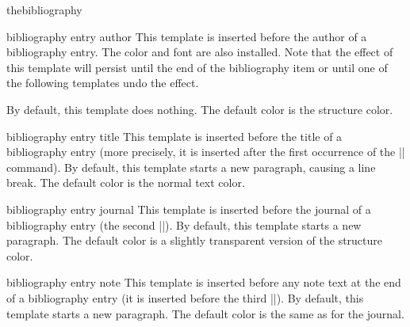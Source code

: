 \begin{environment}{{thebibliography}}
  \begin{element}{bibliography entry author}\yes\yes\yes
    This template is inserted before the author of a bibliography entry. The color and font are also installed. Note that the effect of this template will persist until the end of the bibliography item or until one of the following templates undo the effect.

    By default, this template does nothing. The default color is the structure color.
  \end{element}

  \begin{element}{bibliography entry title}\yes\yes\yes
    This template is inserted before the title of a bibliography entry (more precisely, it is inserted after the first occurrence of the |\newblock| command). By default, this template starts a new paragraph, causing a line break. The default color is the normal text color.
  \end{element}

  \begin{element}{bibliography entry journal}\yes\yes\yes
    This template is inserted before the journal of a bibliography entry (the second |\newblock|). By default, this template starts a new paragraph. The default color is a slightly transparent version of the structure color.
  \end{element}

  \begin{element}{bibliography entry note}\yes\yes\yes
    This template is inserted before any note text at the end of a bibliography entry (it is inserted before the third |\newblock|). By default, this template starts a new paragraph. The default color is the same as for the journal.
  \end{element}
\end{environment}

